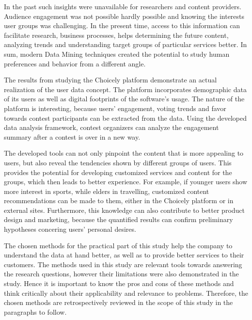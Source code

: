 In the past such insights were unavailable for researchers and content providers. Audience engagement was not possible hardly possible and knowing the interests user groups was challenging. In the present time, access to this information can facilitate research, business processes, helps determining the future content, analyzing trends and understanding target groups of particular services better. In sum, modern Data Mining techniques created the potential to study human preferences and behavior from a different angle.

The results from studying the Choicely platform demonstrate an actual realization of the user data concept. The platform incorporates demographic data of its users as well as digital footprints of the software's usage. The nature of the platform is interesting, because users' engagement, voting trends and favor towards contest participants can be extracted from the data. Using the developed data analysis framework, contest organizers can analyze the engagement summary after a contest is over in a new way. 

The developed tools can not only pinpoint the content that is more appealing to users, but also reveal the tendencies shown by different groups of users. This provides the potential for developing customized services and content for the groups, which then leads to better experience. For example, if younger users show more interest in sports, while elders in travelling, customized content recommendations can be made to them, either in the Choicely platform or in external sites. Furthermore, this knowledge can also contribute to better product design and marketing, because the quantified results can confirm preliminary hypotheses concering users' personal desires. 

The chosen methods for the practical part of this study help the company to understand the data at hand better, as well as to provide better services to their customers. The methods used in this study are relevant tools towards answering the research questions, however their limitations were also demonstrated in the study. Hence it is important to know the pros and cons of these methods and think critically about their applicability and relevance to problems. Therefore, the chosen methods are retrospectively reviewed in the scope of this study in the paragraphs to follow.

